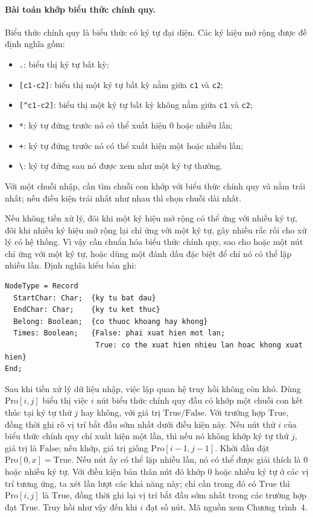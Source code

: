 \documentclass[11pt]{article}
\begin{document}
\paragraph{Bài toán khớp biểu thức chính quy.}
Biểu thức chính quy là biểu thức có ký tự đại diện. Các ký hiệu mở rộng được
đề định nghĩa gồm:
\begin{itemize}
  \item \texttt{.}: biểu thị ký tự bất kỳ;
  \item \texttt{[c1-c2]}: biểu thị một ký tự bất kỳ nằm giữa \texttt{c1} và
  \texttt{c2};
  \item \texttt{[\^{ }c1-c2]}: biểu thị một ký tự bất kỳ không nằm giữa
  \texttt{c1} và \texttt{c2};
  \item \texttt{*}: ký tự đứng trước nó có thể xuất hiện 0 hoặc nhiều lần;
  \item \texttt{+}: ký tự đứng trước nó có thể xuất hiện một hoặc nhiều lần;
  \item \texttt{\textbackslash}: ký tự đứng sau nó được xem như một ký tự
  thường.
\end{itemize}
Với một chuỗi nhập, cần tìm chuỗi con khớp với biểu thức chính quy và nằm trái
nhất; nếu điều kiện trái nhất như nhau thì chọn chuỗi dài nhất.

Nếu không tiền xử lý, đôi khi một ký hiệu mở rộng có thể ứng với nhiều ký tự,
đôi khi nhiều ký hiệu mở rộng lại chỉ ứng với một ký tự, gây nhiều rắc rối cho
xử lý có hệ thống. Vì vậy cần chuẩn hóa biểu thức chính quy, sao cho hoặc một
nút chỉ ứng với một ký tự, hoặc dùng một đánh dấu đặc biệt để chỉ nó có thể
lặp nhiều lần. Định nghĩa kiểu bản ghi:
\begin{verbatim}
NodeType = Record
  StartChar: Char;  {ky tu bat dau}
  EndChar: Char;    {ky tu ket thuc}
  Belong: Boolean;  {co thuoc khoang hay khong}
  Times: Boolean;   {False: phai xuat hien mot lan;
                     True: co the xuat hien nhieu lan hoac khong xuat hien}
End;
\end{verbatim}

Sau khi tiền xử lý dữ liệu nhập, việc lập quan hệ truy hồi không còn khó.
Dùng \(\mathrm{Pro}[i,j]\) biểu thị việc \(i\) nút biểu thức chính quy đầu có
khớp một chuỗi con kết thúc tại ký tự thứ \(j\) hay không, với giá trị
\(\mathrm{True}/\mathrm{False}\). Với trường hợp \(\mathrm{True}\), đồng thời
ghi rõ vị trí bắt đầu sớm nhất dưới điều kiện này. Nếu nút thứ \(i\) của biểu
thức chính quy chỉ xuất hiện một lần, thì nếu nó không khớp ký tự thứ \(j\),
giá trị là \(\mathrm{False}\); nếu khớp, giá trị giống
\(\mathrm{Pro}[i-1,j-1]\). Khởi đầu đặt \(\mathrm{Pro}[0,x]=\mathrm{True}\).
Nếu nút ấy có thể lặp nhiều lần, nó có thể được giải thích là 0 hoặc nhiều ký
tự. Với điều kiện bản thân nút đó khớp 0 hoặc nhiều ký tự ở các vị trí tương
ứng, ta xét lần lượt các khả năng này; chỉ cần trong đó có \(\mathrm{True}\)
thì \(\mathrm{Pro}[i,j]\) là \(\mathrm{True}\), đồng thời ghi lại vị trí bắt
đầu sớm nhất trong các trường hợp đạt \(\mathrm{True}\). Truy hồi như vậy đến
khi \(i\) đạt số nút. Mã nguồn xem Chương trình~4.
\end{document}

